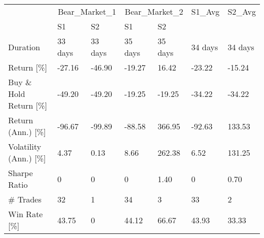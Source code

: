 \begin{tabular}{lllllll}
\toprule
 & \multicolumn{2}{r}{Bear_Market_1} & \multicolumn{2}{r}{Bear_Market_2} & S1_Avg & S2_Avg \\
 & S1 & S2 & S1 & S2 &  &  \\
\midrule
Duration & 33 days  & 33 days  & 35 days  & 35 days  & 34 days  & 34 days  \\
Return  [\%] & -27.16 & -46.90 & -19.27 & 16.42 & -23.22 & -15.24 \\
Buy \& Hold Return  [\%] & -49.20 & -49.20 & -19.25 & -19.25 & -34.22 & -34.22 \\
Return (Ann.)  [\%] & -96.67 & -99.89 & -88.58 & 366.95 & -92.63 & 133.53 \\
Volatility (Ann.)  [\%] & 4.37 & 0.13 & 8.66 & 262.38 & 6.52 & 131.25 \\
Sharpe Ratio & 0  & 0  & 0  & 1.40 & 0  & 0.70 \\
\# Trades & 32 & 1 & 34 & 3 & 33  & 2  \\
Win Rate  [\%] & 43.75 & 0  & 44.12 & 66.67 & 43.93 & 33.33 \\
\bottomrule
\end{tabular}
